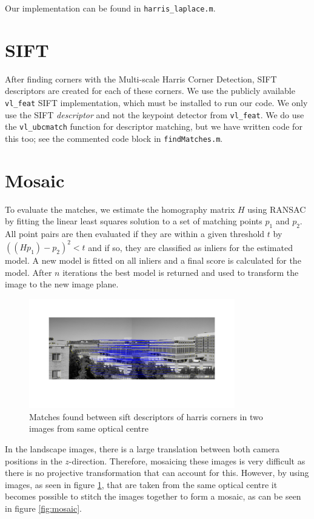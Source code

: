 \documentclass[a4paper,10pt]{article}
\begin{document}
Our implementation can be found in \verb+harris_laplace.m+.

\section{SIFT}
After finding corners with the Multi-scale Harris Corner Detection, SIFT descriptors are created for each of these corners.
We use the publicly available \verb+vl_feat+ SIFT implementation, which must be installed to run our code.
We only use the SIFT \emph{descriptor} and not the keypoint detector from \verb+vl_feat+.
We do use the \verb+vl_ubcmatch+ function for descriptor matching, but we have written code for this too; see the commented code block in \verb+findMatches.m+.


\section{Mosaic}
To evaluate the matches, we estimate the homography matrix $H$ using RANSAC by fitting the linear least squares solution to a set of matching points $p_1$ and $p_2$. All point pairs are then evaluated if they are within a given threshold $t$ by $((H p_1)-p_2)^2 < t$ and if so, they are classified as inliers for the estimated model. A new model is fitted on all inliers and a final score is calculated for the model. After $n$ iterations the best model is returned and used to transform the image to the new image plane. 

\begin{figure}[h!t]
\centering
\includegraphics[width=0.8\textwidth]{img/mosaicmatch}
\caption{Matches found between sift descriptors of harris corners in two images from same optical centre}
\label{fig:mosaicmatch}
\end{figure}

In the landscape images, there is a large translation between both camera positions in the $z$-direction. Therefore, mosaicing these images is very difficult as there is no projective transformation that can account for this. However, by using images, as seen in figure \ref{fig:mosaicmatch}, that are taken from the same optical centre it becomes possible to stitch the images together to form a mosaic, as can be seen in figure \ref{fig:mosaic}.
\end{document}
